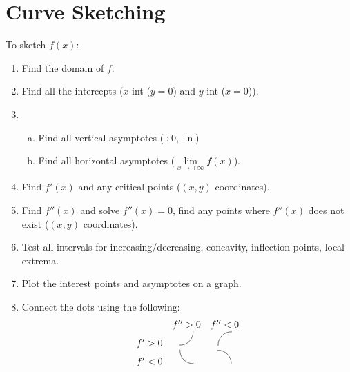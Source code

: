 \section{Curve Sketching}
To sketch $ f(x) $:
\begin{enumerate}[(1)]
    \item Find the domain of $ f $.
    \item Find all the intercepts ($ x $-int ($ y=0 $) and $ y $-int ($ x=0 $)).
    \item \begin{enumerate}[(a)]
              \item Find all vertical asymptotes ($ \div 0 $, $ \ln $)
              \item Find all horizontal asymptotes ($ \lim\limits_{{x} \to {\pm\infty}}f(x) $).
          \end{enumerate}
    \item Find $ f'(x) $ and any critical points ($ (x,y) $ coordinates).
    \item Find $ f''(x) $ and solve $ f''(x)=0 $, find any points where $ f''(x) $ does not exist ($ (x,y) $ coordinates).
    \item Test all intervals for increasing/decreasing, concavity, inflection points, local extrema.
    \item Plot the interest points and asymptotes on a graph.
    \item Connect the dots using the following:
          \[ \begin{array}{ccc}
                       & f''>0                                                      & f''<0                                                     \\
                  f'>0 & \tikz[scale=0.5]{\draw[-] (0,0) to [bend right=50] (1,1)}  & \tikz[scale=0.5]{\draw[-] (0,0) to [bend left=50] (1,1)}  \\
                  f'<0 & \tikz[scale=0.5]{\draw[-] (0,0) to [bend right=50] (1,-1)} & \tikz[scale=0.5]{\draw[-] (0,0) to [bend left=50] (1,-1)}
              \end{array} \]
\end{enumerate}
